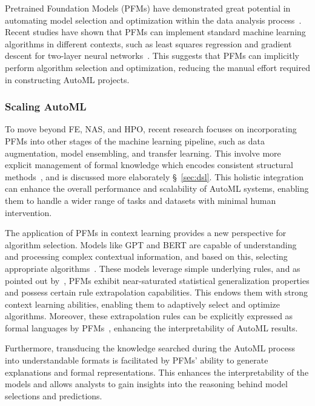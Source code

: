 Pretrained Foundation Models (PFMs) have demonstrated great potential in automating model selection and optimization within the data analysis process~\cite{liu2023jarvix}. Recent studies have shown that PFMs can implement standard machine learning algorithms in different contexts, such as least squares regression and gradient descent for two-layer neural networks~\cite{bai2024transformers}. This suggests that PFMs can implicitly perform algorithm selection and optimization, reducing the manual effort required in constructing AutoML projects.



\subsubsection{Scaling AutoML}

To move beyond FE, NAS, and HPO, recent research focuses on incorporating PFMs into other stages of the machine learning pipeline, such as data augmentation, model ensembling, and transfer learning. This involve more explicit management of formal knowledge which encodes consistent structural methods~\cite{SongY00024, HsuMTW23}, and is discussed more elaborately \S~\ref{sec:dsl}. This holistic integration can enhance the overall performance and scalability of AutoML systems, enabling them to handle a wider range of tasks and datasets with minimal human intervention.

The application of PFMs in context learning provides a new perspective for algorithm selection. Models like GPT and BERT are capable of understanding and processing complex contextual information, and based on this, selecting appropriate algorithms~\cite{009brown2020language, EoTGE}. These models leverage simple underlying rules, and as pointed out by~\cite{reizingerposition}, PFMs exhibit near-saturated statistical generalization properties and possess certain rule extrapolation capabilities. This endows them with strong context learning abilities, enabling them to adaptively select and optimize algorithms. Moreover, these extrapolation rules can be explicitly expressed as formal languages by PFMs~\cite{cheng2022binding}, enhancing the interpretability of AutoML results.

Furthermore, transducing the knowledge searched during the AutoML process into understandable formats is facilitated by PFMs' ability to generate explanations and formal representations. This enhances the interpretability of the models and allows analysts to gain insights into the reasoning behind model selections and predictions.
